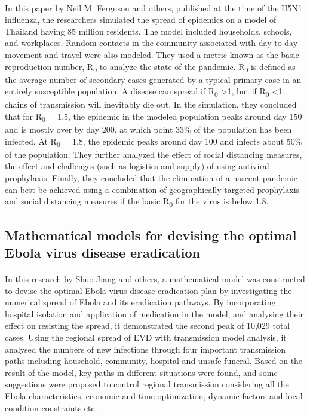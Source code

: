\documentclass[12pt, a4paper]{extarticle}
\begin{document}
	       \paragraph{} In this paper by Neil M. Ferguson and others, published at the time of the H5N1 influenza, the researchers simulated the spread of epidemics on a model of Thailand having 85 million residents. The model included households, schools, and workplaces. Random contacts in the community associated with day-to-day movement and travel were also modeled. They used a metric known as the basic reproduction number, R\textsubscript{0} to analyze the state of the pandemic. R\textsubscript{0} is defined as the average number of secondary cases generated by a typical primary case in an entirely susceptible population. A disease can spread if R\textsubscript{0} \textgreater 1, but if R\textsubscript{0} \textless 1, chains of transmission will inevitably die out. In the simulation, they concluded that for R\textsubscript{0} = 1.5, the epidemic in the modeled population peaks around day 150 and is mostly over by day 200, at which point 33\% of the population has been infected. At R\textsubscript{0} = 1.8, the epidemic peaks around day 100 and infects about 50\% of the population. They further analyzed the effect of social distancing measures, the effect and challenges (such as logistics and supply) of using antiviral prophylaxis. Finally, they concluded that the elimination of a nascent pandemic can best be achieved using a combination of geographically targeted prophylaxis and social distancing measures if the basic R\textsubscript{0} for the virus is below 1.8.
	    \subsection{Mathematical models for devising the optimal Ebola virus disease eradication}
	       \paragraph{} In this research by Shuo Jiang and others, a mathematical model was constructed to devise the optimal Ebola virus disease eradication plan by investigating the numerical spread of Ebola and its eradication pathways. By incorporating hospital isolation and application of medication in the model, and analysing their effect on resisting the spread, it demonstrated the second peak of 10,029 total cases. Using the regional spread of EVD with transmission model analysis, it analysed the numbers of new infections through four important transmission paths including household, community, hospital and unsafe funeral. Based on the result of the model, key paths in different situations were found, and some suggestions were proposed to control regional transmission considering all the Ebola characteristics, economic and time optimization, dynamic factors and local condition constraints etc.
\end{document}
